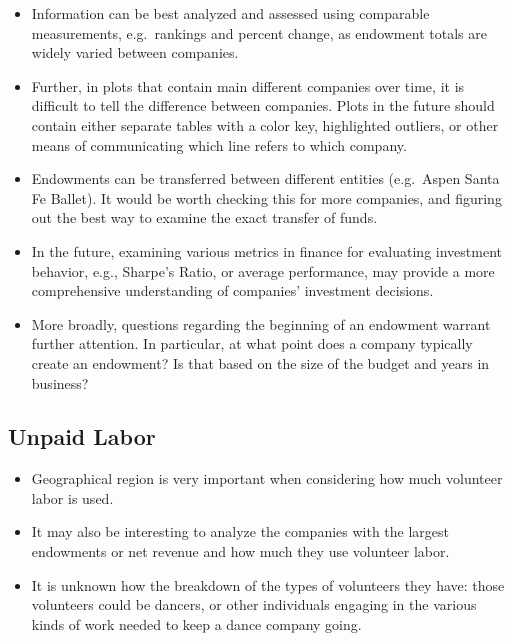\documentclass[Dance Data
Project,article,submit,moreauthors,pdftex]{mdpi}
\providecommand{\tightlist}{%
  \setlength{\itemsep}{0pt}\setlength{\parskip}{0pt}}
\begin{document}
\begin{itemize}
\tightlist
\item
  Information can be best analyzed and assessed using comparable
  measurements, e.g.~rankings and percent change, as endowment totals
  are widely varied between companies.\\
\item
  Further, in plots that contain main different companies over time, it
  is difficult to tell the difference between companies. Plots in the
  future should contain either separate tables with a color key,
  highlighted outliers, or other means of communicating which line
  refers to which company.\\
\item
  Endowments can be transferred between different entities (e.g.~Aspen
  Santa Fe Ballet). It would be worth checking this for more companies,
  and figuring out the best way to examine the exact transfer of
  funds.\\
\item
  In the future, examining various metrics in finance for evaluating
  investment behavior, e.g., Sharpe's Ratio, or average performance, may
  provide a more comprehensive understanding of companies' investment
  decisions.\\
\item
  More broadly, questions regarding the beginning of an endowment
  warrant further attention. In particular, at what point does a company
  typically create an endowment? Is that based on the size of the budget
  and years in business?
\end{itemize}

\hypertarget{unpaid-labor}{%
\subsection{Unpaid Labor}\label{unpaid-labor}}

\begin{itemize}
\tightlist
\item
  Geographical region is very important when considering how much
  volunteer labor is used.\\
\item
  It may also be interesting to analyze the companies with the largest
  endowments or net revenue and how much they use volunteer labor.\\
\item
  It is unknown how the breakdown of the types of volunteers they have:
  those volunteers could be dancers, or other individuals engaging in
  the various kinds of work needed to keep a dance company going.
\end{itemize}
\end{document}
